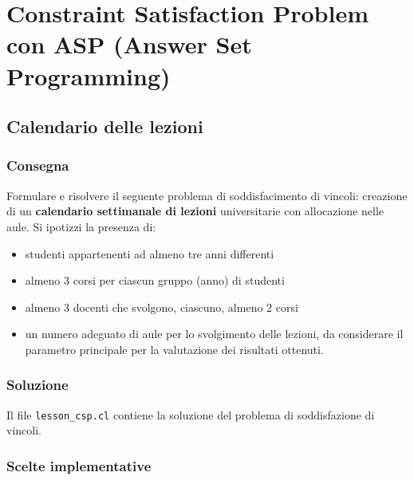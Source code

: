 \documentclass[a4paper,oneside,12pt]{book}
\def \code#1{\texttt{#1}}
\begin{document}
    \section*{Constraint Satisfaction Problem con ASP (Answer Set Programming)}
    \subsection*{Calendario delle lezioni}
    \subsubsection{Consegna}
    Formulare e risolvere il seguente problema di soddisfacimento
    di vincoli:
    creazione di un \textbf{calendario settimanale di lezioni} universitarie con
    allocazione nelle aule.
    Si ipotizzi la presenza di:
    \begin{itemize}
        \item studenti appartenenti ad almeno tre anni differenti
        \item almeno 3 corsi per ciascun gruppo (anno) di studenti
        \item almeno 3 docenti che svolgono, ciascuno, almeno 2
        corsi
        \item un numero adeguato di aule per lo svolgimento delle
        lezioni, da considerare il parametro principale per la
        valutazione dei risultati ottenuti.
    \end{itemize}

    \subsubsection{Soluzione}
    Il file \code{lesson\_csp.cl} contiene la soluzione del problema di soddisfazione di vincoli.
    \subsubsection*{Scelte implementative}
\end{document}
